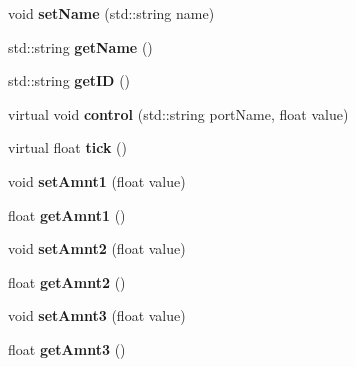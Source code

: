 \begin{DoxyCompactItemize}
\item 
void {\bfseries set\+Name} (std\+::string name)\hypertarget{classunit_1_1UGen_a0a6939e0b4f246b671ef7990217d82ab}{}\label{classunit_1_1UGen_a0a6939e0b4f246b671ef7990217d82ab}

\item 
std\+::string {\bfseries get\+Name} ()\hypertarget{classunit_1_1UGen_adfb82e003597ca4876f803f0395b28d6}{}\label{classunit_1_1UGen_adfb82e003597ca4876f803f0395b28d6}

\item 
std\+::string {\bfseries get\+ID} ()\hypertarget{classunit_1_1UGen_a500ba300703167f4daa52b51841edf24}{}\label{classunit_1_1UGen_a500ba300703167f4daa52b51841edf24}

\item 
virtual void {\bfseries control} (std\+::string port\+Name, float value)\hypertarget{classunit_1_1UGen_a456a55e23a073bc77135525be38ad0eb}{}\label{classunit_1_1UGen_a456a55e23a073bc77135525be38ad0eb}

\item 
virtual float {\bfseries tick} ()\hypertarget{classunit_1_1UGen_a7fe124a01b35094197816cb8aa033c55}{}\label{classunit_1_1UGen_a7fe124a01b35094197816cb8aa033c55}

\item 
void {\bfseries set\+Amnt1} (float value)\hypertarget{classunit_1_1UGen_a5063e6854f054cf7870abf1fdcbf8e30}{}\label{classunit_1_1UGen_a5063e6854f054cf7870abf1fdcbf8e30}

\item 
float {\bfseries get\+Amnt1} ()\hypertarget{classunit_1_1UGen_a98614bdc04b7c096fa7a75e486898947}{}\label{classunit_1_1UGen_a98614bdc04b7c096fa7a75e486898947}

\item 
void {\bfseries set\+Amnt2} (float value)\hypertarget{classunit_1_1UGen_a13494a4d13ad1fd32d16d5d22c22fb6d}{}\label{classunit_1_1UGen_a13494a4d13ad1fd32d16d5d22c22fb6d}

\item 
float {\bfseries get\+Amnt2} ()\hypertarget{classunit_1_1UGen_aa051f663b3fd0568eae2cad11b69058c}{}\label{classunit_1_1UGen_aa051f663b3fd0568eae2cad11b69058c}

\item 
void {\bfseries set\+Amnt3} (float value)\hypertarget{classunit_1_1UGen_aad0a3b7250c400216930062d651a1cf4}{}\label{classunit_1_1UGen_aad0a3b7250c400216930062d651a1cf4}

\item 
float {\bfseries get\+Amnt3} ()\hypertarget{classunit_1_1UGen_ac884f3a8cd1886698a9e2745940b9e1a}{}\label{classunit_1_1UGen_ac884f3a8cd1886698a9e2745940b9e1a}


\end{DoxyCompactItemize}
